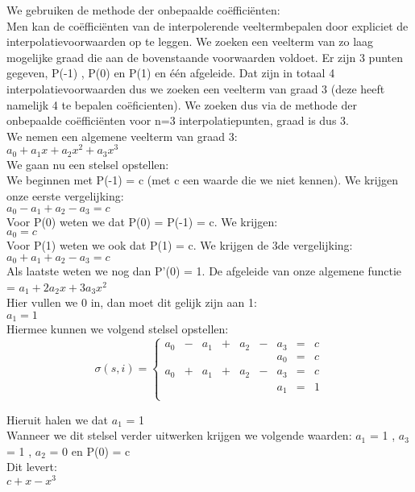 We gebruiken de methode der onbepaalde co\"effici\"enten: \\
Men kan de co\"effici\"enten van de interpolerende veeltermbepalen door expliciet de interpolatievoorwaarden op te leggen. We zoeken een veelterm van zo laag mogelijke graad die aan de bovenstaande voorwaarden voldoet.   Er zijn 3 punten gegeven, P(-1) , P(0) en P(1) en \'e\'en afgeleide. Dat zijn in totaal 4 interpolatievoorwaarden dus we zoeken een veelterm van graad 3 (deze heeft namelijk 4 te bepalen co\"eficienten). We zoeken dus via de methode der onbepaalde co\"effici\"enten voor n=3 interpolatiepunten, graad is dus 3.\\
We nemen een algemene veelterm van graad 3: \\
\indent $ a_0 + a_1x + a_2x^2 + a_3x^3 $ \\
We gaan nu een stelsel opstellen: \\
We beginnen met P(-1) = c (met c een waarde die we niet kennen). We krijgen onze eerste vergelijking:\\
\indent $ a_0 - a_1 + a_2 - a_3 = c$ \\
Voor P(0) weten we dat P(0) = P(-1) = c. We krijgen: \\
\indent $ a_0 = c $ \\
Voor P(1) weten we ook dat P(1) = c. We krijgen de 3de vergelijking: \\
\indent $ a_0 + a_1 + a_2 - a_3 = c $ \\
Als laatste weten we nog dan P'(0) = 1. De afgeleide van onze algemene functie = $ a_1 + 2a_2x + 3a_3x^2$ \\
Hier vullen we 0 in, dan moet dit gelijk zijn aan 1: \\
\indent $ a_1 = 1$ \\
Hiermee kunnen we volgend stelsel opstellen: \\

\[
\sigma(s,i) = \left\{
    \begin{array}{ccccccccc}
		a_0 & - & a_1 & + & a_2 & - & a_3 & = & c \\
							  &&&&&& a_0 & = & c \\
		a_0 & + & a_1 & + & a_2 & - & a_3 & = & c \\
		                      &&&&&& a_1 & = & 1 \\
    \end{array}
\right.
\]


Hieruit halen we dat $a_1$ = 1 \\
Wanneer we dit stelsel verder uitwerken krijgen we volgende waarden:
$a_1$ = 1 , $a_3$ = 1 , $a_2$ = 0  en P(0) = c\\
Dit levert: \\
$c+x-x^3$